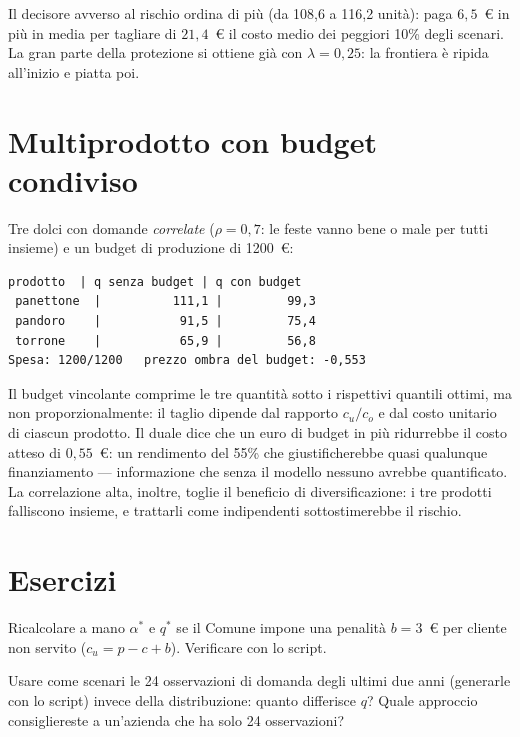 Il decisore avverso al rischio ordina di più (da 108,6 a 116,2 unità): paga
$6{,}5$~\euro{} in più in media per tagliare di $21{,}4$~\euro{} il costo medio dei
peggiori 10\% degli scenari. La gran parte della protezione si ottiene già con
$\lambda = 0{,}25$: la frontiera è ripida all'inizio e piatta poi.

\section{Multiprodotto con budget condiviso}

Tre dolci con domande \emph{correlate} ($\rho = 0{,}7$: le feste vanno bene o male per
tutti insieme) e un budget di produzione di 1200~\euro:

\begin{lstlisting}[style=output]
  prodotto  | q senza budget | q con budget
 panettone  |          111,1 |         99,3
 pandoro    |           91,5 |         75,4
 torrone    |           65,9 |         56,8
Spesa: 1200/1200   prezzo ombra del budget: -0,553
\end{lstlisting}

\begin{spiegazione}
Il budget vincolante comprime le tre quantità sotto i rispettivi quantili ottimi, ma
non proporzionalmente: il taglio dipende dal rapporto $c_u/c_o$ e dal costo unitario
di ciascun prodotto. Il duale dice che un euro di budget in più ridurrebbe il costo
atteso di $0{,}55$~\euro: un rendimento del 55\% che giustificherebbe quasi qualunque
finanziamento --- informazione che senza il modello nessuno avrebbe quantificato.
La correlazione alta, inoltre, toglie il beneficio di diversificazione: i tre
prodotti falliscono insieme, e trattarli come indipendenti sottostimerebbe il rischio.
\end{spiegazione}

\section{Esercizi}

\begin{esercizio}[verifica]
Ricalcolare a mano $\alpha^*$ e $q^*$ se il Comune impone una penalità
$b = 3$~\euro{} per cliente non servito ($c_u = p - c + b$). Verificare con lo script.
\end{esercizio}

\begin{esercizio}
Usare come scenari le 24 osservazioni di domanda degli ultimi due anni (generarle con
lo script) invece della distribuzione: quanto differisce $q$? Quale approccio
consigliereste a un'azienda che ha solo 24 osservazioni?
\end{esercizio}

